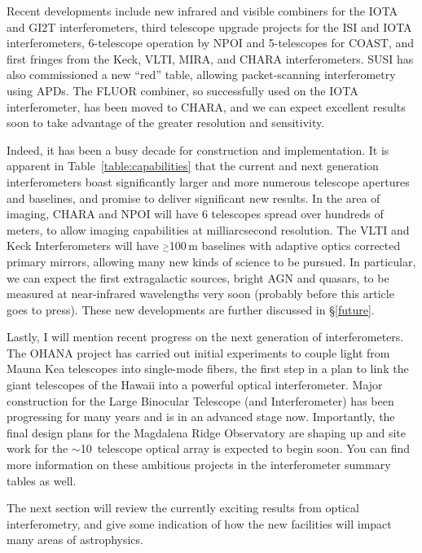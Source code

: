 \documentclass[12pt]{iopart}
\newcommand{\simge}{\mbox{$\stackrel{>}{_{\sim}}$}}
\begin{document}
Recent developments include new infrared and visible combiners
for the IOTA \citep[first integrated optics success with
stars][]{berger2001} and GI2T interferometers, third telescope upgrade
projects for the ISI and IOTA interferometers, 6-telescope operation
by NPOI and 5-telescopes for COAST, and first fringes from the Keck,
VLTI, MIRA, and CHARA interferometers. SUSI has also commissioned a
new ``red'' table, allowing packet-scanning interferometry using APDs.
The FLUOR combiner, so successfully used on the IOTA interferometer,
has been moved to CHARA, and we can expect excellent results soon to
take advantage of the greater resolution and sensitivity.

Indeed, it has been a busy decade for construction and implementation.
It is apparent in Table~\ref{table:capabilities}  that
the current and next generation interferometers boast
significantly larger and more numerous telescope apertures and
baselines, and promise to deliver significant new results.  In the
area of imaging, CHARA and NPOI will have 6 telescopes spread over
hundreds of meters, to allow imaging capabilities at milliarcsecond
resolution.  The VLTI and Keck Interferometers will have
$\simge$100\,m baselines with adaptive optics corrected primary
mirrors, allowing many new kinds of science to be pursued. In
particular, we can expect the first extragalactic sources, bright AGN
and quasars, to be measured at near-infrared wavelengths very soon
(probably before this article goes to press).  These new developments
are further discussed in \S\ref{future}.

Lastly, I will mention recent progress on the next generation of
interferometers.  The OHANA project has carried out initial
experiments to couple light from Mauna Kea telescopes into single-mode
fibers, the first step in a plan to link the giant telescopes of the
Hawaii into a powerful optical interferometer.  Major construction for
the Large Binocular Telescope (and Interferometer) has been
progressing for many years and is in an advanced stage now.
Importantly, the final design plans for the Magdalena Ridge
Observatory are shaping up and site work for the $\sim$10~telescope
optical array is expected to begin soon.  You can find more
information on these ambitious projects in the interferometer summary
tables as well.

The next section will review the currently exciting results from
optical interferometry, and give some indication of how the new
facilities will impact many areas of astrophysics.
\end{document}
